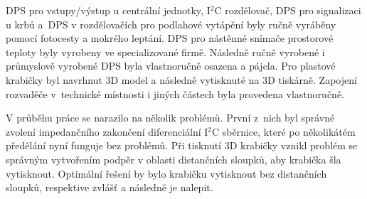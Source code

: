 DPS pro vstupy/výstup u centrální jednotky, I$^{2}$C rozdělovač, DPS pro signalizaci u krbů a~DPS v rozdělovačích pro podlahové vytápění byly ručně vyráběny pomocí fotocesty a mokrého leptání. DPS pro nástěnné snímače prostorové teploty byly vyrobeny ve specializované firmě. Následně ručně vyrobené i průmyslově vyrobené DPS byla vlastnoručně osazena a pájela. Pro plastové krabičky byl navrhnut 3D model a následně vytisknuté na 3D tiskárně. Zapojení rozvaděče v~technické místnosti i jiných částech byla provedena vlastnoručně.

V průběhu práce se narazilo na několik problémů. První z~nich byl správné zvolení impedančního zakončení diferenciální I$^{2}$C sběrnice, které po několikátém předělání nyní funguje bez problémů. Při tisknutí 3D krabičky vznikl problém se správným vytvořením podpěr v oblasti distančních sloupků, aby krabička šla vytisknout. Optimální řešení by bylo krabičku vytisknout bez distančních sloupků, respektive zvlášť a následně je nalepit.

